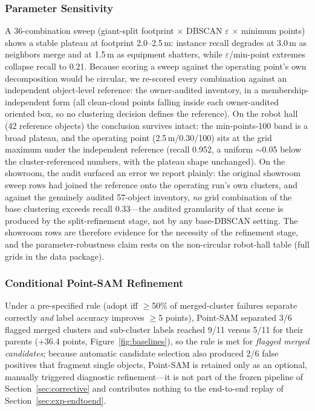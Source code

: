 \documentclass[electronics,article,accept,pdftex,moreauthors]{Definitions/mdpi}
\begin{document}
\subsubsection{Parameter Sensitivity}
A 36-combination sweep (giant-split footprint $\times$ DBSCAN
$\varepsilon$ $\times$ minimum points) shows a stable plateau
at footprint 2.0--2.5\,m: instance recall degrades at 3.0\,m as neighbors
merge and at 1.5\,m as equipment shatters, while
$\varepsilon$/min-point extremes collapse recall to 0.21. Because scoring
a sweep against the operating point's own decomposition would be
circular, we re-scored every combination against an independent
object-level reference: the owner-audited inventory, in a
membership-independent form (all clean-cloud points falling inside each
owner-audited oriented box, so no clustering decision defines the
reference). On the robot hall (42 reference objects) the conclusion
survives intact: the min-points-100 band is a broad plateau, and the
operating point (2.5\,m/0.30/100) sits at the grid maximum under
the independent reference (recall 0.952, a uniform $\sim$0.05 below the
cluster-referenced numbers, with the plateau shape unchanged). On the
showroom, the audit surfaced an error we report plainly: the original
showroom sweep rows had joined the reference onto the operating run's
own clusters, and against the genuinely audited 57-object inventory,
\emph{no} grid combination of the base clustering exceeds recall 0.33---the audited granularity of that scene is produced by the
split-refinement stage, not by any base-DBSCAN setting. The showroom
rows are therefore evidence for the necessity of the refinement stage,
and the parameter-robustness claim rests on the non-circular robot-hall
table (full grids in the data package).

\subsubsection{Conditional Point-SAM Refinement}
Under a pre-specified rule (adopt iff $\geq$50\% of merged-cluster failures
separate correctly \emph{and} label accuracy improves $\geq$5 points),
Point-SAM separated 3/6 flagged merged clusters and sub-cluster labels
reached 9/11 versus 5/11 for their parents (+36.4 points,
Figure~\ref{fig:baselines}), so the rule is met for \emph{flagged merged
candidates}; because automatic candidate selection also produced 2/6
false positives that fragment single objects, Point-SAM is retained only
as an optional, manually triggered diagnostic refinement---it is not part
of the frozen pipeline of Section~\ref{sec:corrective} and contributes
nothing to the end-to-end replay of Section~\ref{sec:exp-endtoend}.
\end{document}
